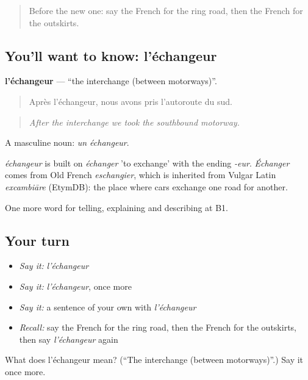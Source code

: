 \begin{quote}
Before the new one: say the French for the ring road, then the French for the outskirts.
\end{quote}

\subsection*{You'll want to know: l'échangeur}
\textbf{l'échangeur} — \textquotedblleft{}the interchange (between motorways)\textquotedblright{}.

\begin{quote}
Après l'échangeur, nous avons pris l'autoroute du sud.
\end{quote}

\begin{quote}
\emph{After the interchange we took the southbound motorway.}
\end{quote}

A masculine noun: \emph{un échangeur}.

\begin{cousinweb}
\emph{échangeur} is built on \emph{échanger} 'to exchange' with the ending \emph{-eur}. \emph{Échanger} comes from Old French \emph{eschangier}, which is inherited from Vulgar Latin \emph{excambiāre} (EtymDB): the place where cars exchange one road for another.
\end{cousinweb}

\begin{grammarlens}[title={What you've built}]
One more word for telling, explaining and describing at B1.
\end{grammarlens}

\subsection*{Your turn}
\begin{itemize}
\raggedright
  \item \emph{Say it:} \emph{l'échangeur}
  \item \emph{Say it:} \emph{l'échangeur}, once more
  \item \emph{Say it:} a sentence of your own with \emph{l'échangeur}
  \item \emph{Recall:} say the French for the ring road, then the French for the outskirts, then say \emph{l'échangeur} again
\end{itemize}

\begin{tcolorbox}[breakable,colback=teal!4,colframe=teal!35!black,title={Before you move on}]
What does l'échangeur mean? (\textquotedblleft{}The interchange (between motorways)\textquotedblright{}.) Say it once more.
\end{tcolorbox}
